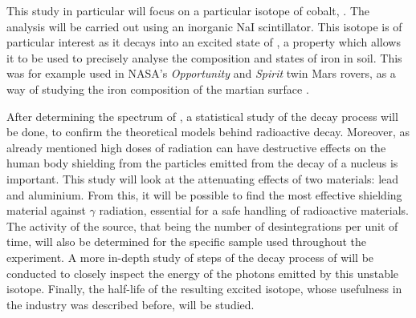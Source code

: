 This study in particular will focus on a particular isotope of cobalt, \cobalt.
The analysis will be carried out using an inorganic NaI scintillator.
This isotope is of particular interest as it decays into an excited state of \iron, a property which allows it to be used to precisely analyse the composition and states of iron in soil.
This was for example used in NASA's \emph{Opportunity} and \emph{Spirit} twin Mars rovers, as a way of studying the iron composition of the martian surface \cite{klingelhofer_mossbauer_2004} \cite{schroder_mossbauer_2015}.

After determining the spectrum of \cobalt, a statistical study of the decay process will be done, to confirm the theoretical models behind radioactive decay.
Moreover, as already mentioned high doses of radiation can have destructive effects on the human body
shielding from the particles emitted from the decay of a nucleus is important.
This study will look at the attenuating effects of two materials: lead and aluminium. From this, it will be possible to find the most effective shielding material against \(\gamma\) radiation, essential for a safe handling of radioactive materials.
The activity of the source, that being the number of desintegrations per unit of time, will also be determined for the specific \cobalt sample used throughout the experiment.
A more in-depth study of steps of the decay process of \cobalt will be conducted to closely inspect the energy of the photons emitted by this unstable isotope.
Finally, the half-life of the resulting excited \iron isotope, whose usefulness in the industry was described before, will be studied.

